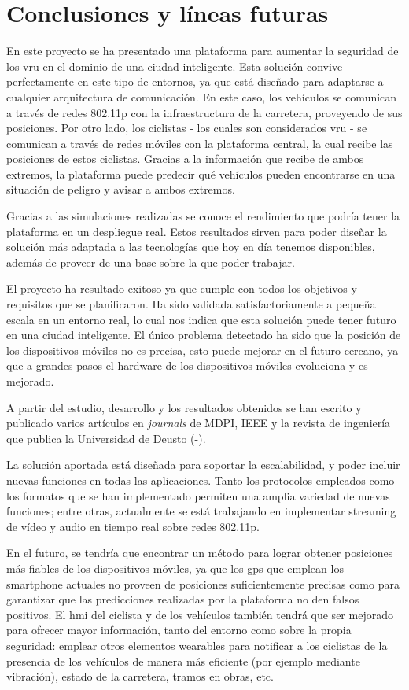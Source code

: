 \chapter{Conclusiones y líneas futuras}
En este proyecto se ha presentado una plataforma para aumentar la seguridad de
los \gls{vru} en el dominio de una ciudad inteligente. Esta solución convive
perfectamente en este tipo de entornos, ya que está diseñado para adaptarse a
cualquier arquitectura de comunicación. En este caso, los vehículos se
comunican a través de redes \gls{802.11p} con la infraestructura de la
carretera, proveyendo de sus posiciones. Por otro lado, los ciclistas - los
cuales son considerados \gls{vru} - se comunican a través de redes móviles con
la plataforma central, la cual recibe las posiciones de estos ciclistas.
Gracias a la información que recibe de ambos extremos, la plataforma puede
predecir qué vehículos pueden encontrarse en una situación de peligro y avisar
a ambos extremos.

Gracias a las simulaciones realizadas se conoce el rendimiento que podría tener
la plataforma en un despliegue real. Estos resultados sirven para poder diseñar
la solución más adaptada a las tecnologías que hoy en día tenemos disponibles,
además de proveer de una base sobre la que poder trabajar.

El proyecto ha resultado exitoso ya que cumple con todos los objetivos y
requisitos que se planificaron. Ha sido validada satisfactoriamente a pequeña
escala en un entorno real, lo cual nos indica que esta solución puede tener
futuro en una ciudad inteligente. El único problema detectado ha sido que la
posición de los dispositivos móviles no es precisa, esto puede mejorar en el
futuro cercano, ya que a grandes pasos el hardware de los dispositivos móviles
evoluciona y es mejorado.

A partir del estudio, desarrollo y los resultados obtenidos se han escrito
y publicado varios artículos en \emph{journals} de MDPI, IEEE y la revista
de ingeniería que publica la Universidad de Deusto (\cite{18}-\cite{21}).

La solución aportada está diseñada para soportar la escalabilidad, y poder
incluir nuevas funciones en todas las aplicaciones. Tanto los protocolos
empleados como los formatos que se han implementado permiten una amplia
variedad de nuevas funciones; entre otras, actualmente se está trabajando en
implementar streaming de vídeo y audio en tiempo real sobre redes \gls{802.11p}.

En el futuro, se tendría que encontrar un método para lograr obtener posiciones
más fiables de los dispositivos móviles, ya que los \gls{gps} que emplean los
smartphone actuales no proveen de posiciones suficientemente precisas como para
garantizar que las predicciones realizadas por la plataforma no den falsos
positivos. El \gls{hmi} del ciclista y de los vehículos también tendrá que ser
mejorado para ofrecer mayor información, tanto del entorno como sobre la propia
seguridad: emplear otros elementos wearables para notificar a los ciclistas de
la presencia de los vehículos de manera más eficiente (por ejemplo mediante
vibración), estado de la carretera, tramos en obras, etc.
